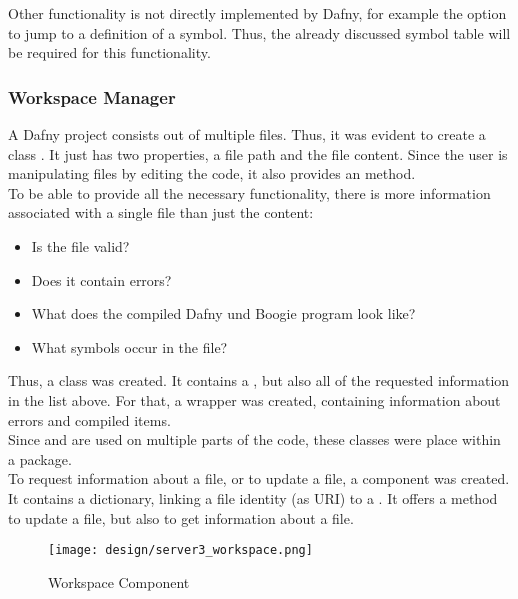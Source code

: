 Other functionality is not directly implemented by Dafny, for example the option to jump to a definition of a symbol.
Thus, the already discussed symbol table will be required for this functionality.\\


\subsubsection{Workspace Manager}
A Dafny project consists out of multiple  files.
Thus, it was evident to create a class .
It just has two properties, a file path and the file content.
Since the user is manipulating files by editing the code, it also provides an  method.\\

To be able to provide all the necessary functionality, there is more information associated with a single file than just the content:
\begin{itemize}
    \item Is the file valid?
    \item Does it contain errors?
    \item What does the compiled Dafny und Boogie program look like?
    \item What symbols occur in the file?
\end{itemize}

Thus, a class  was created.
It contains a , but also all of the requested information in the list above.
For that, a wrapper  was created, containing information about errors and compiled items.\\

Since  and  are used on multiple parts of the code, these classes were place within a  package.\\

To request information about a file, or to update a file, a component  was created.
It contains a dictionary, linking a file identity (as URI) to a .
It offers a method to update a file, but also to get information about a file.\\

\begin{figure}[ht]
    \centering
    \texttt{[image: design/server3\_workspace.png]}
    \caption{Workspace Component}
    \label{fig:server_workspace}
\end{figure}

